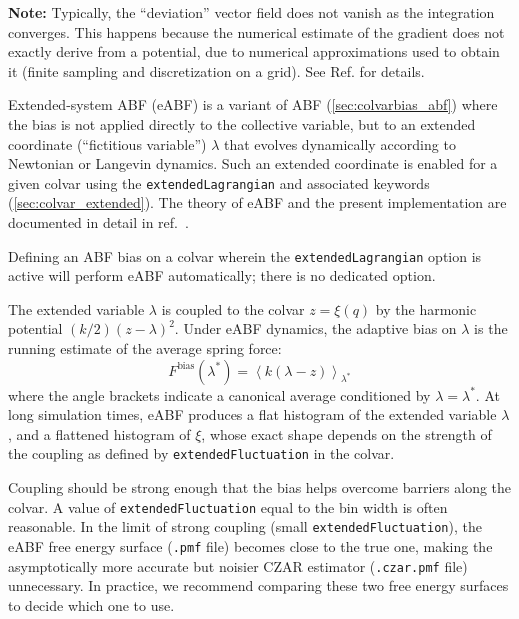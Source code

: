 \textbf{Note:} Typically, the ``deviation'' vector field does not
vanish as the integration converges. This happens because the
numerical estimate of the gradient does not exactly derive from a
potential, due to numerical approximations used to obtain it (finite
sampling and discretization on a grid). See Ref.\cite{Henin2021} for details.




Extended-system ABF (eABF) is a variant of ABF (\ref{sec:colvarbias_abf})
where the bias is not applied
directly to the collective variable, but to an extended coordinate  (``fictitious variable'')
$\lambda$ that evolves dynamically according to Newtonian or Langevin dynamics.
Such an extended coordinate is enabled for a given colvar using the
\texttt{extendedLagrangian} and associated keywords (\ref{sec:colvar_extended}).
The theory of eABF and the present implementation are documented in detail
in ref.\ \citealp{Lesage2017}.

Defining an ABF bias on a colvar wherein the \texttt{extendedLagrangian} option
is active will perform eABF automatically; there is no dedicated option.

The extended variable $\lambda$ is coupled to the colvar $z=\xi(q)$ by the harmonic potential
$(k/2) (z - \lambda)^2$.
Under eABF dynamics, the adaptive bias on $\lambda$ is
the running estimate of the average spring force:
\begin{equation}
F^{\mathrm{bias}}(\lambda^{*}) = \left\langle k(\lambda{} - z) \right\rangle_{\lambda^{*}}
\end{equation}
where the angle brackets indicate a canonical average conditioned by $\lambda=\lambda^*$.
At long simulation times, eABF produces a flat histogram of the extended variable $\lambda$,
and a flattened histogram of $\xi$, whose exact shape depends on the strength of the coupling
as defined by \texttt{extendedFluctuation} in the colvar.

Coupling should be strong enough that the bias helps overcome barriers along the colvar.\cite{Lesage2017}
A value of \texttt{extendedFluctuation} equal to the bin width is often reasonable.
In the limit of strong coupling (small \texttt{extendedFluctuation}), the eABF free energy surface
(\texttt{.pmf} file) becomes close to the true one, making the asymptotically more accurate but
noisier CZAR estimator (\texttt{.czar.pmf} file) unnecessary.
In practice, we recommend comparing these two free energy surfaces to decide which one to use.

